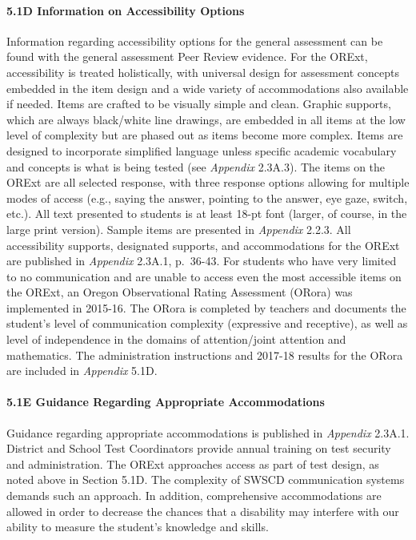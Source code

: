 \documentclass[]{article}
\let\oldparagraph\paragraph
\renewcommand{\paragraph}[1]{\oldparagraph{#1}\mbox{}}
\begin{document}
\paragraph{5.1D Information on Accessibility
Options}\label{d-information-on-accessibility-options}

Information regarding accessibility options for the general assessment
can be found with the general assessment Peer Review evidence. For the
ORExt, accessibility is treated holistically, with universal design for
assessment concepts embedded in the item design and a wide variety of
accommodations also available if needed. Items are crafted to be
visually simple and clean. Graphic supports, which are always
black/white line drawings, are embedded in all items at the low level of
complexity but are phased out as items become more complex. Items are
designed to incorporate simplified language unless specific academic
vocabulary and concepts is what is being tested (see \emph{Appendix}
2.3A.3). The items on the ORExt are all selected response, with three
response options allowing for multiple modes of access (e.g., saying the
answer, pointing to the answer, eye gaze, switch, etc.). All text
presented to students is at least 18-pt font (larger, of course, in the
large print version). Sample items are presented in \emph{Appendix}
2.2.3. All accessibility supports, designated supports, and
accommodations for the ORExt are published in \emph{Appendix} 2.3A.1,
p.~36-43. For students who have very limited to no communication and are
unable to access even the most accessible items on the ORExt, an Oregon
Observational Rating Assessment (ORora) was implemented in 2015-16. The
ORora is completed by teachers and documents the student's level of
communication complexity (expressive and receptive), as well as level of
independence in the domains of attention/joint attention and
mathematics. The administration instructions and 2017-18 results for the
ORora are included in \emph{Appendix} 5.1D.

\paragraph{5.1E Guidance Regarding Appropriate
Accommodations}\label{e-guidance-regarding-appropriate-accommodations}

Guidance regarding appropriate accommodations is published in
\emph{Appendix} 2.3A.1. District and School Test Coordinators provide
annual training on test security and administration. The ORExt
approaches access as part of test design, as noted above in Section
5.1D. The complexity of SWSCD communication systems demands such an
approach. In addition, comprehensive accommodations are allowed in order
to decrease the chances that a disability may interfere with our ability
to measure the student's knowledge and skills.
\end{document}
